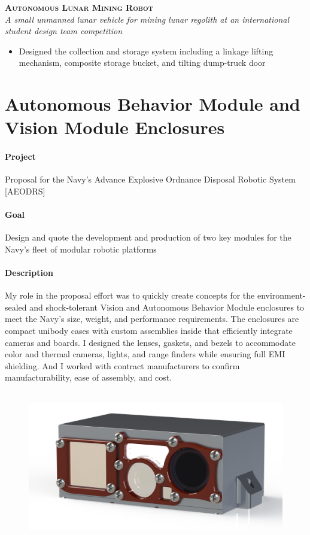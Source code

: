 \documentclass[12pt, landscape]{article}
\begin{document}
  \begin{samepage}
    \textbf{\scshape Autonomous Lunar Mining Robot}\\
    \textit{A small unmanned lunar vehicle for mining lunar regolith at an international student design team competition}
    \begin{itemize} 
      \item Designed the collection and storage system including a linkage lifting mechanism, composite storage bucket, and tilting dump-truck door
    \end{itemize}
  \end{samepage}

  \clearpage

	\section{Autonomous Behavior Module and Vision Module Enclosures}
		\paragraph{Project} Proposal for the Navy's Advance Explosive Ordnance Disposal Robotic System [AEODRS]
		\paragraph{Goal} Design and quote the development and production of two key modules for the Navy's fleet of modular robotic platforms
		\paragraph{Description} My role in the proposal effort was to quickly create concepts for the environment-sealed and shock-tolerant Vision and Autonomous Behavior Module enclosures to meet the Navy's size, weight, and performance requirements. The enclosures are compact unibody cases with custom assemblies inside that efficiently integrate cameras and boards. I designed the lenses, gaskets, and bezels to accommodate color and thermal cameras, lights, and range finders while ensuring full EMI shielding. And I worked with contract manufacturers to confirm manufacturability, ease of assembly, and cost.

	\begin{figure}[H]
		\centering
		\includegraphics[height=2.6in]{media/VIS-1}
		\label{VIS 1}
	\end{figure}
\end{document}
